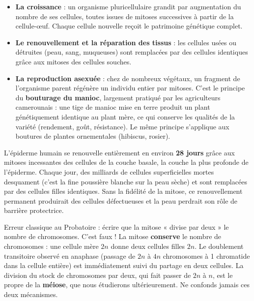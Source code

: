 \documentclass[11pt]{article}
\begin{document}
\begin{aretenir}
\begin{itemize}
\item \textbf{La croissance} : un organisme pluricellulaire grandit par augmentation du nombre de ses cellules, toutes issues de mitoses successives à partir de la cellule-œuf. Chaque cellule nouvelle reçoit le patrimoine génétique complet.
\item \textbf{Le renouvellement et la réparation des tissus} : les cellules usées ou détruites (peau, sang, muqueuses) sont remplacées par des cellules identiques grâce aux mitoses des cellules souches.
\item \textbf{La reproduction asexuée} : chez de nombreux végétaux, un fragment de l'organisme parent régénère un individu entier par mitoses. C'est le principe du \textbf{bouturage du manioc}, largement pratiqué par les agriculteurs camerounais : une tige de manioc mise en terre produit un plant génétiquement identique au plant mère, ce qui conserve les qualités de la variété (rendement, goût, résistance). Le même principe s'applique aux boutures de plantes ornementales (hibiscus, rosier).
\end{itemize}
\end{aretenir}

\begin{savaistu}
L'épiderme humain se renouvelle entièrement en environ \textbf{28 jours} grâce aux mitoses incessantes des cellules de la couche basale, la couche la plus profonde de l'épiderme. Chaque jour, des milliards de cellules superficielles mortes desquament (c'est la fine poussière blanche sur la peau sèche) et sont remplacées par des cellules filles identiques. Sans la fidélité de la mitose, ce renouvellement permanent produirait des cellules défectueuses et la peau perdrait son rôle de barrière protectrice.
\end{savaistu}

\begin{attention}
Erreur classique au Probatoire : écrire que la mitose « divise par deux » le nombre de chromosomes. C'est faux ! La mitose \textbf{conserve} le nombre de chromosomes : une cellule mère $2n$ donne deux cellules filles $2n$. Le doublement transitoire observé en anaphase (passage de $2n$ à $4n$ chromosomes à 1 chromatide dans la cellule entière) est immédiatement suivi du partage en deux cellules. La division du stock de chromosomes par deux, qui fait passer de $2n$ à $n$, est le propre de la \textbf{méiose}, que nous étudierons ultérieurement. Ne confonds jamais ces deux mécanismes.
\end{attention}
\end{document}
